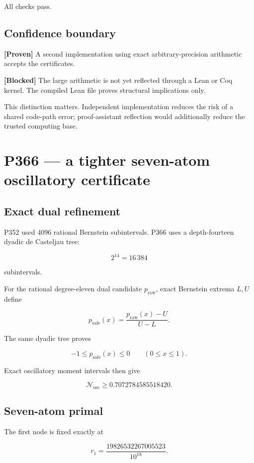 \documentclass[11pt,a4paper,openany]{report}
\newcommand{\statusProven}{\textcolor{fingreen}{[Proven]}}
\begin{document}
All checks pass.

\section{Confidence boundary}

\textbf{\statusProven{}} A second implementation using exact arbitrary-precision arithmetic accepts the certificates.

\textbf{[Blocked]} The large arithmetic is not yet reflected through a Lean or Coq kernel. The compiled Lean file proves structural implications only.

This distinction matters. Independent implementation reduces the risk of a shared code-path error; proof-assistant reflection would additionally reduce the trusted computing base.

\chapter{P366 --- a tighter seven-atom oscillatory certificate}

\section{Exact dual refinement}

P352 used 4096 rational Bernstein subintervals. P366 uses a depth-fourteen dyadic de Casteljau tree:

\[
2^{14}=16\,384
\]

subintervals.

For the rational degree-eleven dual candidate \(p_{\mathrm{raw}}\), exact Bernstein extrema \(L,U\) define

\[
p_{\mathrm{safe}}(x)=
\frac{p_{\mathrm{raw}}(x)-U}{U-L}.
\]

The same dyadic tree proves

\[
-1\leq p_{\mathrm{safe}}(x)\leq0
\qquad(0\leq x\leq1).
\]

Exact oscillatory moment intervals then give

\[
\mathcal N_{\mathrm{osc}}
\geq0.7072784585518420.
\]

\section{Seven-atom primal}

The first node is fixed exactly at

\[
r_1=
\frac{19826532267005523}{10^{18}}.
\]
\end{document}
